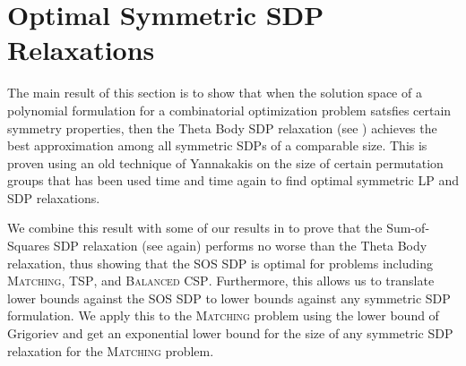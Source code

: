 \chapter{Optimal Symmetric SDP Relaxations}\label{cha:symmetric_sdps}
The main result of this section is to show that when the solution space of a polynomial formulation for a combinatorial optimization problem satsfies certain symmetry properties, then the Theta Body SDP relaxation (see ) achieves the best approximation among all symmetric SDPs of a comparable size. This is proven using an old technique of Yannakakis on the size of certain permutation groups that has been used time and time again to find optimal symmetric LP and SDP relaxations. 

We combine this result with some of our results in  to prove that the Sum-of-Squares SDP relaxation (see  again) performs no worse than the Theta Body relaxation, thus showing that the SOS SDP is optimal for problems including \textsc{Matching}, \textsc{TSP}, and \textsc{Balanced CSP}. Furthermore, this allows us to translate lower bounds against the SOS SDP to lower bounds against any symmetric SDP formulation. We apply this to the \textsc{Matching} problem using the lower bound of Grigoriev \cite{Gri01} and get an exponential lower bound for the size of any symmetric SDP relaxation for the \textsc{Matching} problem.

